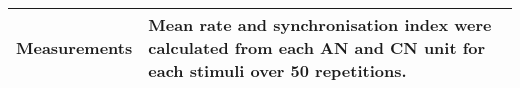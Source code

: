 {\begin{table}[ptb]
\begin{tabularx}{\textwidth}{|l|X|}
\textbf{Measurements}    &  
Mean rate and synchronisation index were calculated from each AN and CN unit for each stimuli over 50 repetitions.
\\\hline
\end{tabularx}
\end{table}
}





